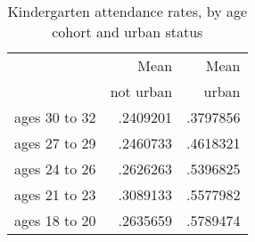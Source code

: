 \begin{table}[!h]
\caption{Kindergarten attendance rates, by age cohort and urban status}
\centering
\begin{tabular}{lll}
\cline{1-3}
\multicolumn{1}{c}{} &
  \multicolumn{1}{|r}{Mean} &
  \multicolumn{1}{r}{Mean} \\
\multicolumn{1}{c}{} &
  \multicolumn{1}{|r}{not urban} &
  \multicolumn{1}{r}{urban} \\
\cline{1-3}
\multicolumn{1}{l}{ages 30 to 32} &
  \multicolumn{1}{|r}{.2409201} &
  \multicolumn{1}{r}{.3797856} \\
\multicolumn{1}{l}{ages 27 to 29} &
  \multicolumn{1}{|r}{.2460733} &
  \multicolumn{1}{r}{.4618321} \\
\multicolumn{1}{l}{ages 24 to 26} &
  \multicolumn{1}{|r}{.2626263} &
  \multicolumn{1}{r}{.5396825} \\
\multicolumn{1}{l}{ages 21 to 23} &
  \multicolumn{1}{|r}{.3089133} &
  \multicolumn{1}{r}{.5577982} \\
\multicolumn{1}{l}{ages 18 to 20} &
  \multicolumn{1}{|r}{.2635659} &
  \multicolumn{1}{r}{.5789474} \\
\cline{1-3}
\end{tabular}
\end{table}

